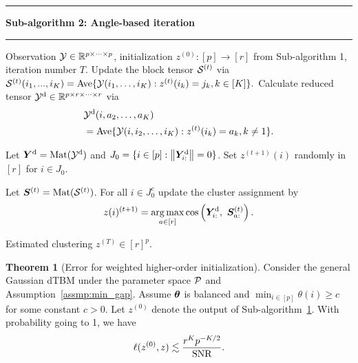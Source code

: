 \documentclass[lettersize,journal]{IEEEtran}
\theoremstyle{definition}
\newtheorem{thm}{Theorem}
\theoremstyle{definition}
\newcommand{\of}[1]{\left(#1\right)}
\newcommand\Algphase[1]{%
\vspace*{-.7\baselineskip}\Statex\hspace*{\dimexpr-\algorithmicindent-2pt\relax}\rule{\columnwidth}{0.4pt}%
\Statex\hspace*{-\algorithmicindent}\textbf{#1}%
\vspace*{-.7\baselineskip}\Statex\hspace*{\dimexpr-\algorithmicindent-2pt\relax}\rule{\columnwidth}{0.4pt}%
}
\def\fixme#1#2{\textbf{\color{red}[FIXME (#1): #2]}}
\begin{document}
\begin{algorithm}[h!]
\begin{algorithmic}[1]
\Algphase{Sub-algorithm 2: Angle-based iteration}
\INPUT Observation $\mathcal{Y} \in \mathbb{R}^{p \times \cdots \times p}$, initialization $z^{(0)} \colon [p]\to[r]$ from Sub-algorithm 1, iteration number $T$.
\State Update the block tensor $\mathcal{S}^{(t)}$ via
$\mathcal{S}^{(t)} (i_1,...,i_K)= \text{Ave} \{\mathcal{Y}(i_1,\ldots,i_K): z^{(t)}(i_k) = j_k, k \in [K]\}.$
\State Calculate reduced tensor $\mathcal{Y}^{\text{d}} \in \mathbb{R}^{p \times r \times \cdots \times r}$ via
\begin{align}
    &\mathcal{Y}^{\text{d}}(i,a_2,\ldots,a_K) \\
    &= 
\text{Ave}\{\mathcal{Y}(i,i_2,\ldots,i_K): z^{(t)}(i_k) = a_k, k \neq 1 \}.
\end{align}

\State Let $\bm Y^{\text{d}} = \text{Mat}(\mathcal{Y}^{\text{d}})$ and $J_0 = \{ i\in[p]: \left\lVert\bm Y^{\text{d}}_{i:}\right\rVert = 0\}$. Set $z^{(t+1)}(i)$ randomly in $[r]$ for $i \in J_0$.

\State Let $\bm S^{(t)} = \text{Mat}(\mathcal{S}^{(t)})$. For all $i \in J_0^c$ update the cluster assignment by
\begin{equation}
    z(i)^{(t+1)} = \operatorname*{arg\,max}_{a \in [r]} \cos \left( \bm Y^{\text{d}}_{i:},\ \bm S^{(t)}_{a:} \right).
\end{equation}

\EndFor

\OUTPUT Estimated clustering $z^{(T)}  \in [r]^{p}$.

\end{algorithmic}
\end{algorithm}


\begin{thm}[Error for weighted higher-order initialization]\label{thm:initial} Consider the general Gaussian dTBM under the parameter space $\mathcal{P}$ and Assumption~\ref{assmp:min_gap}. 
Assume $\boldsymbol{\theta}$ is balanced and $\min_{i\in[p]}\theta(i) \geq c$ for some constant $c>0$. Let $ z^{(0)}$ denote the output of Sub-algorithm~\hyperref[alg:main]{1}. With probability going to 1, we have
\begin{equation}\label{eq:ini}
   \ell(z^{(0)}, z) \lesssim {r^K p^{-K/2}\over \text{SNR}}. 
\end{equation}
\end{thm}
\end{document}
